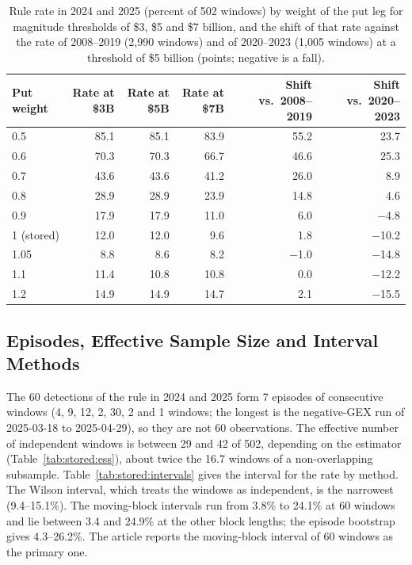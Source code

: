 \begin{table}[H]
\centering
\caption{Rule rate in 2024 and 2025 (percent of 502 windows) by weight of the put leg for magnitude thresholds of \$3, \$5 and \$7 billion, and the shift of that rate against the rate of 2008--2019 (2{,}990 windows) and of 2020--2023 (1{,}005 windows) at a threshold of \$5 billion (points; negative is a fall).}
\label{tab:stored:putweight}
\footnotesize
\begin{tabular}{@{}lrrrrr@{}}
\toprule
Put weight & Rate at \$3B & Rate at \$5B & Rate at \$7B & Shift vs.\ 2008--2019 & Shift vs.\ 2020--2023 \\
\midrule
0.5 & 85.1 & 85.1 & 83.9 & 55.2 & 23.7 \\
0.6 & 70.3 & 70.3 & 66.7 & 46.6 & 25.3 \\
0.7 & 43.6 & 43.6 & 41.2 & 26.0 & 8.9 \\
0.8 & 28.9 & 28.9 & 23.9 & 14.8 & 4.6 \\
0.9 & 17.9 & 17.9 & 11.0 & 6.0 & $-$4.8 \\
1 (stored) & 12.0 & 12.0 & 9.6 & 1.8 & $-$10.2 \\
1.05 & 8.8 & 8.6 & 8.2 & $-$1.0 & $-$14.8 \\
1.1 & 11.4 & 10.8 & 10.8 & 0.0 & $-$12.2 \\
1.2 & 14.9 & 14.9 & 14.7 & 2.1 & $-$15.5 \\
\bottomrule
\end{tabular}
\end{table}

\subsection{Episodes, Effective Sample Size and Interval Methods}
\label{sup:stored:e3}

The 60 detections of the rule in 2024 and 2025 form 7 episodes of consecutive windows (4, 9, 12, 2, 30, 2 and 1 windows; the longest is the negative-GEX run of 2025-03-18 to 2025-04-29), so they are not 60 observations. The effective number of independent windows is between 29 and 42 of 502, depending on the estimator (Table~\ref{tab:stored:ess}), about twice the 16.7 windows of a non-overlapping subsample. Table~\ref{tab:stored:intervals} gives the interval for the rate by method. The Wilson interval, which treats the windows as independent, is the narrowest (9.4--15.1\%). The moving-block intervals run from 3.8\% to 24.1\% at 60 windows and lie between 3.4 and 24.9\% at the other block lengths; the episode bootstrap gives 4.3--26.2\%. The article reports the moving-block interval of 60 windows as the primary one.


